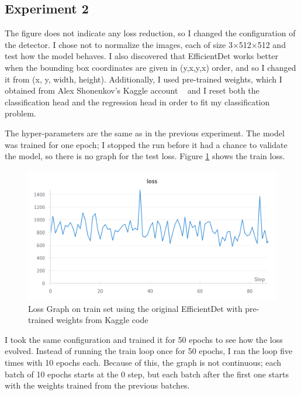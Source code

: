 \subsection{Experiment 2}

The figure does not indicate any loss reduction, so I changed the configuration of the detector. I chose not to normalize the images, each of size 3$\times$512$\times$512 and test how the model behaves. I also discovered that EfficientDet works better when the bounding box coordinates are given in (y,x,y,x) order, and so I changed it from (x, y, width, height). Additionally, I used pre-trained weights, which I obtained from Alex Shonenkov's Kaggle account ~\cite{link6} and I reset both the classification head and the regression head in order to fit my classification problem. 

The hyper-parameters are the same as in the previous experiment. The model was trained for one epoch; I stopped the run before it had a chance to validate the model, so there is no graph for the test loss. Figure \ref{fig:fig24} shows the train loss.

\begin{figure}[!ht]
    \centering
    \includegraphics[width=1\linewidth]{figures/Figure27.png}
    \caption{Loss Graph on train set using the original EfficientDet with pre-trained weights from Kaggle code}
    \label{fig:fig24}
\end{figure}

I took the same configuration and trained it for 50 epochs to see how the loss evolved. Instead of running the train loop once for 50 epochs, I ran the loop five times with 10 epochs each. Because of this, the graph is not continuous; each batch of 10 epochs starts at the 0 step, but each batch after the first one starts with the weights trained from the previous batches.
 
